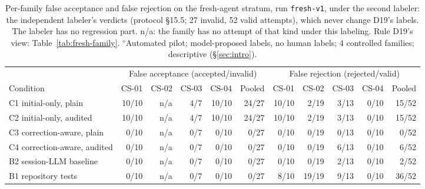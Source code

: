 \begin{table}[t]\centering\footnotesize\setlength{\tabcolsep}{4pt}
\caption{Per-family false acceptance and false rejection on the fresh-agent stratum, run \texttt{fresh-v1}, under the second labeler: the independent labeler's verdicts (protocol \S15.5; 27 invalid, 52 valid attempts), which never change D19's labels. The labeler has no regression part. n/a: the family has no attempt of that kind under this labeling. Rule D19's view: Table~\ref{tab:fresh-family}. $^{\diamond}$Automated pilot; model-proposed labels, no human labels; 4 controlled families; descriptive (\S\ref{sec:intro}).}\label{tab:fresh-family-labeler}
\begin{tabular}{lrrrrrrrrrr}\toprule  & \multicolumn{5}{c}{False acceptance (accepted/invalid)} & \multicolumn{5}{c}{False rejection (rejected/valid)} \\\cmidrule(lr){2-6}\cmidrule(lr){7-11} Condition & CS-01 & CS-02 & CS-03 & CS-04 & Pooled & CS-01 & CS-02 & CS-03 & CS-04 & Pooled \\\midrule
C1 initial-only, plain & 10/10 & n/a & 4/7 & 10/10 & 24/27 & 10/10 & 2/19 & 3/13 & 0/10 & 15/52 \\
C2 initial-only, audited & 10/10 & n/a & 4/7 & 10/10 & 24/27 & 10/10 & 2/19 & 3/13 & 0/10 & 15/52 \\
C3 correction-aware, plain & 0/10 & n/a & 0/7 & 0/10 & 0/27 & 0/10 & 0/19 & 0/13 & 0/10 & 0/52 \\
C4 correction-aware, audited & 0/10 & n/a & 0/7 & 0/10 & 0/27 & 0/10 & 0/19 & 6/13 & 0/10 & 6/52 \\
B2 session-LLM baseline & 0/10 & n/a & 0/7 & 0/10 & 0/27 & 0/10 & 0/19 & 2/13 & 0/10 & 2/52 \\
B1 repository tests & 0/10 & n/a & 0/7 & 0/10 & 0/27 & 8/10 & 19/19 & 9/13 & 0/10 & 36/52 \\
\bottomrule\end{tabular}\end{table}

